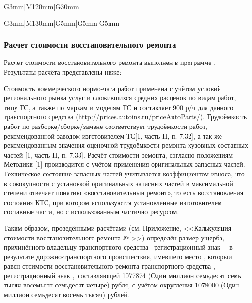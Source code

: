 \begin{longtable}{G{3mm}|M{120mm}|G{30mm}}
\begin{longtable}{G{3mm}|M{130mm}|G{5mm}|G{5mm}|G{5mm}}
\subsubsection{Расчет стоимости восстановительного ремонта}
\par Расчет стоимости восстановительного ремонта выполнен в программе \auda.\\
\indent Результаты расчёта представлены ниже:
%

\medskip
\renewcommand\baselinestretch{1.2}\small\normalsize
Стоимость коммерческого нормо-часа работ применена  с учётом условий регионального рынка услуг и сложившихся средних расценок по видам работ, типу ТС, а также по маркам и моделям ТС  и   составляет 900 р/ч для данного транспортного средства (\url{http://prices.autoins.ru/priceAutoParts/}). Трудоёмкость работ по разборке/сборке/замене  соответствует трудоёмкости работ, рекомендованной заводом изготовителем ТС[1, часть II, п. 7.32], а так же рекомендованным значения оценочной трудоёмкости ремонта кузовных составных частей [1, часть II, п. 7.33]. Расчёт стоимости ремонта, согласно положениям Методики [1] производится с учётом  применения оригинальных запасных частей. %
Техническое состояние запасных частей учитывается коэффициентом износа, что в совокупности с установкой оригинальных запасных частей в максимальной степени отвечает понятию «восстановительный ремонт», то есть восстановления состояния КТС, при котором используются установленные изготовителем составные части, но с использованным частично ресурсом.  
%
\par Таким образом,   проведёнными расчётами (см. Приложение, <<Калькуляция стоимости восстановительного ремонта № \NomerDoc>>) определён размер ущерба, причинённого владельцу  транспортного средства \tc\, регистрационный знак \, \, в результате дорожно-транспортного происшествия, имевшего место , который  равен стоимости восстановительного ремонта транспортного средства  , регистрационный  знак ,\, составляющей 1077874 (Один миллион семьдесят семь тысяч восемьсот семьдесят четыре) рубля,  с учётом округления 1078000 (Один миллион семьдесят восемь тысяч) рублей.




\end{longtable}
\end{longtable}
